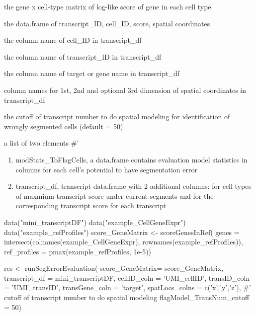 \documentclass[letterpaper]{book}
\begin{document}
\begin{Arguments}
\begin{ldescription}
\item[\code{score\_GeneMatrix}] the gene x cell-type matrix of log-like score of gene in each cell type

\item[\code{transcript\_df}] the data.frame of transcript\_ID, cell\_ID, score, spatial coordinates

\item[\code{cellID\_coln}] the column name of cell\_ID in transcript\_df

\item[\code{transID\_coln}] the column name of transcript\_ID in transcript\_df

\item[\code{transGene\_coln}] the column name of target or gene name in transcript\_df

\item[\code{spatLocs\_colns}] column names for 1st, 2nd and optional 3rd dimension of spatial coordinates in transcript\_df

\item[\code{flagModel\_TransNum\_cutoff}] the cutoff of transcript number to do spatial modeling for identification of wrongly segmented cells (default = 50)
\end{ldescription}
\end{Arguments}
%
\begin{Value}
a list of two elements
\#' \begin{enumerate}

\item{} modStats\_ToFlagCells, a data.frame contains evaluation model statistics in columns for each cell's potential to have segmentation error
\item{} transcript\_df, transcript data.frame with 2 additional columns:  for cell types of maxmium transcript score under current segments and  for the corresponding transcript score for each transcript

\end{enumerate}

\end{Value}
%
\begin{Examples}
\begin{ExampleCode}
data("mini_transcriptDF")
data("example_CellGeneExpr")
data("example_refProfiles")
score_GeneMatrix <- scoreGenesInRef(
  genes = intersect(colnames(example_CellGeneExpr), rownames(example_refProfiles)), 
  ref_profiles = pmax(example_refProfiles, 1e-5))

res <- runSegErrorEvaluation(
  score_GeneMatrix= score_GeneMatrix, 
  transcript_df = mini_transcriptDF, 
  cellID_coln = 'UMI_cellID', 
  transID_coln = 'UMI_transID',
  transGene_coln = 'target',
  spatLocs_colns = c('x','y','z'),
  #' cutoff of transcript number to do spatial modeling
  flagModel_TransNum_cutoff = 50) 
\end{ExampleCode}
\end{Examples}
\end{document}
